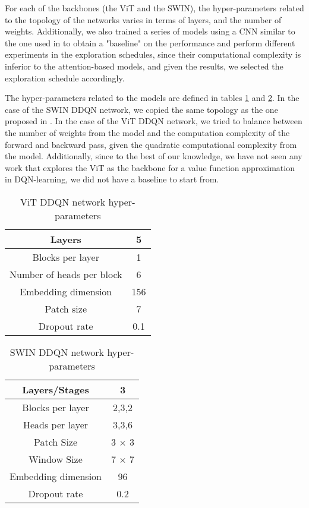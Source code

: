 For each of the backbones (the ViT and the SWIN), the hyper-parameters related to the topology of the networks varies in terms of layers, and the number of weights. Additionally, we also trained a series of models using a CNN similar to the one used in \cite{vanhasselt2015deep} to obtain a "baseline" on the performance and perform different experiments in the exploration schedules, since their computational complexity is inferior to the attention-based models, and given the results, we selected the exploration schedule accordingly.

The hyper-parameters related to the models are defined in tables \ref{tab:swin-hyper-parameters} and \ref{tab:vit-hyper-parameters}. In the case of the SWIN DDQN network, we copied the same topology as the one proposed in \cite{meng2024deep}. In the case of the ViT DDQN network, we tried to balance between the number of weights from the model and the computation complexity of the forward and backward pass, given the quadratic computational complexity from the model. Additionally, since to the best of our knowledge, we have not seen any work that explores the ViT as the backbone for a value function approximation in DQN-learning, we did not have a baseline to start from.

\begin{table}[!h]
	\begin{center}
		\caption[Sample table (short title)]{ViT DDQN network hyper-parameters}
		\label{tab:swin-hyper-parameters}
		\begin{tabular}{||c | c||} 
			\hline
			 Layers & 5 \\
			 \hline
			 Blocks per layer & 1 \\
			 \hline
			 Number of heads per block & 6 \\
			 \hline
			 Embedding dimension & 156 \\
			 \hline
			 Patch size & 7 \\
			 \hline
			 Dropout rate & 0.1 \\
			 \hline
		\end{tabular}
	\end{center}
\end{table}

\begin{table}[!h]
	\begin{center}
		\caption[Sample table (short title)]{SWIN DDQN network hyper-parameters}
		\label{tab:vit-hyper-parameters}
		\begin{tabular}{||c | c||} 
			\hline
			Layers/Stages & 3 \\
			\hline
			Blocks per layer & 2,3,2 \\
			\hline
			Heads per layer & 3,3,6 \\
			\hline
			Patch Size & 3 $\times$ 3 \\
			\hline
			Window Size & 7 $\times$ 7 \\
			\hline
			Embedding dimension & 96 \\
			\hline
			Dropout rate & 0.2 \\
			\hline
		\end{tabular}
	\end{center}
\end{table}

